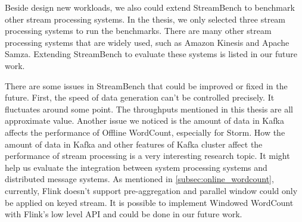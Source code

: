 Beside design new workloads, we also could extend StreamBench to benchmark other stream processing systems. In the thesis, we only selected three stream processing systems to run the benchmarks. There are many other stream processing systems that are widely used, such as Amazon Kinesis and Apache Samza. Extending StreamBench to evaluate these systems is listed in our future work.

There are some issues in StreamBench that could be improved or fixed in the future. First, the speed of data generation can't be controlled precisely. It fluctuates around some point. The throughputs mentioned in this thesis are all approximate value. Another issue we noticed is the amount of data in Kafka affects the performance of Offline WordCount, especially for Storm. How the amount of data in Kafka and other features of Kafka cluster affect the performance of stream processing is a very interesting research topic. It might help us evaluate the integration between system processing systems and distributed message systems. As mentioned in \cref{subsec:online_wordcount}, currently, Flink doesn't support pre-aggregation and parallel window could only be applied on keyed stream. It is possible to implement Windowed WordCount with Flink's low level API and could be done in our future work. 

\clearpage


